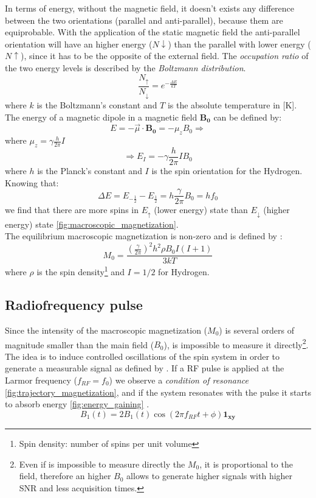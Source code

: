 \noindent In terms of energy, without the magnetic field, it doesn't exists any difference between the two orientations (parallel and anti-parallel), because them are equiprobable. With the application of the static magnetic field the anti-parallel orientation will have an higher energy ($N\downarrow$) than the parallel with lower energy ($N\uparrow$), since it has to be the opposite of the external field. The \emph{occupation ratio} of the two energy levels is described by the \emph{Boltzmann distribution}.
 \begin{equation}
    \frac{N_\uparrow}{N_\downarrow}=e^{-\frac{\Delta E}{k T}}
 \end{equation}
 where $k$ is the Boltzmann's constant and $T$ is the absolute temperature in [K].\\
 The energy of a magnetic dipole in a magnetic field $\mathbf{B_0}$ can be defined by:
 \[E=-\vec{\mu}\cdot\mathbf{B_0}=-\mu_z B_0 \Rightarrow\]
 where $\mu_z=\gamma\frac{h}{2\pi}I$ 
 \[\Rightarrow E_I=-\gamma\frac{h}{2\pi}I B_0\]
 where $h$ is the Planck's constant and $I$ is the spin orientation for the Hydrogen.
 Knowing that:
 \[\Delta E=E_{-\frac{1}{2}} - E_{\frac{1}{2}} = h\frac{\gamma}{2\pi}B_0 = h f_0\]
 we find that there are more spins in $E_\uparrow$ (lower energy) state than $E_\downarrow$ (higher energy) state \ref{fig:macroscopic_magnetization}.\\
 The equilibrium macroscopic magnetization is non-zero and is defined by \cite{slides}:
 \begin{equation}
    M_0=\frac{(\frac{\gamma}{2\pi})^{2}h^{2}\rho B_{0}I (I+1)}{3kT}
 \end{equation}
 where $\rho$ is the spin density\footnote{Spin density: number of spins per unit volume} and $I = 1/2$ for Hydrogen.

 \subsection{Radiofrequency pulse}
 Since the intensity of the macroscopic magnetization ($M_0$) is several orders of magnitude smaller than the main field ($B_0$), is impossible to measure it directly\footnote{Even if is impossible to measure directly the $M_0$, it is proportional to the field, therefore an higher $B_0$ allows to generate higher signals with higher SNR and less acquisition times.}.\\
 The idea is to induce controlled oscillations of the spin system in order to generate a measurable signal as defined by \cite{slides}. If a RF pulse is applied at the Larmor frequency ($f_{RF} = f_0$) we observe a \emph{condition of resonance} \ref{fig:trajectory_magnetization}, and if the system resonates with the pulse it starts to absorb energy \ref{fig:energy_gaining} .
 \begin{equation}
    B_{1}(t)=2B_{1}(t)\cos(2\pi f_{RF}t+\phi)\mathbf{1_{xy}}
 \end{equation}

